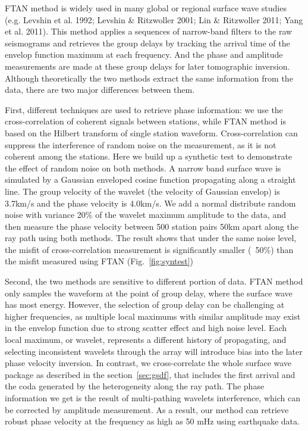 \documentclass{gji}
\begin{document}
FTAN method is widely used in many global or regional surface wave studies (e.g. Levshin et al. 1992; Levshin \& Ritzwoller 2001; Lin \& Ritzwoller 2011; Yang et al. 2011). This method applies a sequences of narrow-band filters to the raw seismograms and retrieves the group delays by tracking the arrival time of the envelop function maximum at each frequency. And the phase and amplitude measurements are made at these group delays for later tomographic inversion. Although theoretically the two methods extract the same information from the data, there are two major differences between them. 

First, different techniques are used to retrieve phase information: we use the cross-correlation of coherent signals between stations, while FTAN method is based on the Hilbert transform of single station waveform. Cross-correlation can suppress the interference of random noise on the measurement, as it is not coherent among the stations. Here we build up a synthetic test to demonstrate the effect of random noise on both methods. A narrow band surface wave is simulated by a Gaussian enveloped cosine function propagating along a straight line. The group velocity of the wavelet (the velocity of Gaussian envelop) is 3.7km/s and the phase velocity is 4.0km/s. We add a normal distribute random noise with variance 20\% of the wavelet maximum amplitude to the data, and then measure the phase velocity between 500 station pairs 50km apart along the ray path using both methods. The result shows that under the same noise level, the misfit of cross-correlation measurement is significantly smaller (~50\%) than the misfit measured using FTAN (Fig.~\ref{fig:syntest})

Second, the two methods are sensitive to different portion of data. FTAN method only samples the waveform at the point of group delay, where the surface wave has most energy. However, the selection of group delay can be challenging at higher frequencies, as multiple local maximums with similar amplitude may exist in the envelop function due to strong scatter effect and high noise level. Each local maximum, or wavelet, represents a different history of propagating, and selecting inconsistent wavelets through the array will introduce bias into the later phase velocity inversion. In contrast, we cross-correlate the whole surface wave package as described in the section~\ref{sec:gsdf}, that includes the first arrival and the coda generated by the heterogeneity along the ray path. The phase information we get is the result of multi-pathing wavelets interference, which can be corrected by amplitude measurement. As a result, our method can retrieve robust phase velocity at the frequency as high as 50 mHz using earthquake data.
\end{document}

